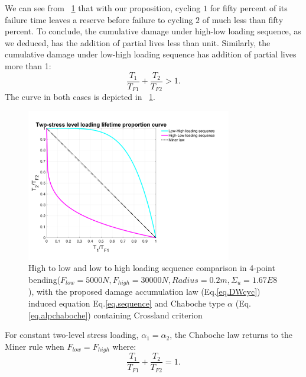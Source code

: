 \documentclass[3p,times,procedia,number]{elsarticle}
\newcommand{\figref}[1]{\figurename~\ref{#1}}
\begin{document}
We can see from \figref{fig.sequence} that with our proposition, cycling $1$ for fifty percent of its failure time leaves a reserve before failure to cycling $2$ of much less than fifty percent. To conclude, the cumulative damage under high-low loading sequence, as we deduced, has the addition of partial lives less than unit. Similarly, the cumulative damage under low-high loading sequence has addition of partial lives more than 1:
$$\frac{T_1}{T_{F1}}+\frac{T_2}{T_{F2}}>1.$$
The curve in both cases is depicted in \figref{fig.sequence}.
\begin{figure}[!h]
\centering
\includegraphics[width=0.8\textwidth]{figures//sequence.png} 
\caption{High to low and low to high loading sequence comparison in 4-point bending($F_{low}=5000 N, F_{high}=30000 N, Radius=0.2m, \Sigma_u=1.67E8$), with the proposed damage accumulation law (Eq.\eqref{eq.DWcyc}) induced equation Eq.\eqref{eq.sequence} and Chaboche type $\alpha$ (Eq.\eqref{eq.alpchaboche}) containing Crossland criterion}
\label{fig.sequence}
\end{figure}
For constant two-level stress loading, $\alpha_1=\alpha_2$, the Chaboche law returns to the Miner rule when $F_{low}=F_{high}$ where:
$$\frac{T_1}{T_{F1}}+\frac{T_2}{T_{F2}}=1.$$
\end{document}
